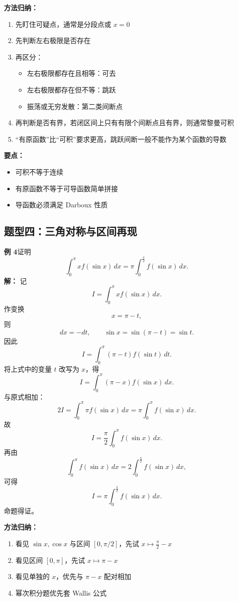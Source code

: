 \documentclass[12pt,a4paper]{ctexart}
\begin{document}
\textbf{方法归纳：}
\begin{enumerate}
  \item 先盯住可疑点，通常是分段点或 $x=0$
  \item 先判断左右极限是否存在
  \item 再区分：
  \begin{itemize}
    \item 左右极限都存在且相等：可去
    \item 左右极限都存在但不等：跳跃
    \item 振荡或无穷发散：第二类间断点
  \end{itemize}
  \item 再判断是否有界，若闭区间上只有有限个间断点且有界，则通常黎曼可积
  \item “有原函数”比“可积”要求更高，跳跃间断一般不能作为某个函数的导数
\end{enumerate}

\textbf{要点：}
\begin{itemize}
  \item 可积不等于连续
  \item 有原函数不等于可导函数简单拼接
  \item 导函数必须满足 Darboux 性质
\end{itemize}

\subsection{题型四：三角对称与区间再现}

\begin{examplebox}
\textbf{例 4}\quad 证明
\[
\int_0^\pi x f(\sin x)\,dx
=
\pi\int_0^{\frac{\pi}{2}}f(\sin x)\,dx.
\]
\textbf{解：}
记
\[
I=\int_0^\pi x f(\sin x)\,dx.
\]
作变换
\[
x=\pi-t,
\]
则
\[
dx=-dt,
\qquad
\sin x=\sin(\pi-t)=\sin t.
\]
因此
\[
I=\int_0^\pi (\pi-t)f(\sin t)\,dt.
\]
将上式中的变量 $t$ 改写为 $x$，得
\[
I=\int_0^\pi (\pi-x)f(\sin x)\,dx.
\]
与原式相加：
\[
2I=\int_0^\pi \pi f(\sin x)\,dx
=\pi\int_0^\pi f(\sin x)\,dx.
\]
故
\[
I=\frac{\pi}{2}\int_0^\pi f(\sin x)\,dx.
\]
再由
\[
\int_0^\pi f(\sin x)\,dx=2\int_0^{\frac{\pi}{2}}f(\sin x)\,dx,
\]
可得
\[
I=\pi\int_0^{\frac{\pi}{2}}f(\sin x)\,dx.
\]
命题得证。
\end{examplebox}

\textbf{方法归纳：}
\begin{enumerate}
  \item 看见 $\sin x,\cos x$ 与区间 $[0,\pi/2]$，先试 $x\mapsto \frac{\pi}{2}-x$
  \item 看见区间 $[0,\pi]$，先试 $x\mapsto \pi-x$
  \item 看见单独的 $x$，优先与 $\pi-x$ 配对相加
  \item 幂次积分题优先套 Wallis 公式
\end{enumerate}
\end{document}
